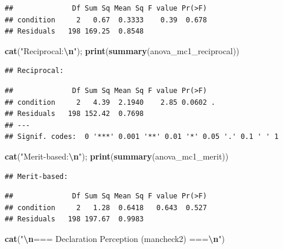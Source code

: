 \documentclass[
]{article}
\newenvironment{Shaded}{\begin{snugshade}}{\end{snugshade}}
\newcommand{\FunctionTok}[1]{\textcolor[rgb]{0.13,0.29,0.53}{\textbf{#1}}}
\newcommand{\NormalTok}[1]{#1}
\newcommand{\SpecialCharTok}[1]{\textcolor[rgb]{0.81,0.36,0.00}{\textbf{#1}}}
\newcommand{\StringTok}[1]{\textcolor[rgb]{0.31,0.60,0.02}{#1}}
\begin{document}
\begin{verbatim}
##              Df Sum Sq Mean Sq F value Pr(>F)
## condition     2   0.67  0.3333    0.39  0.678
## Residuals   198 169.25  0.8548
\end{verbatim}

\begin{Shaded}
\begin{Highlighting}[]
\FunctionTok{cat}\NormalTok{(}\StringTok{"Reciprocal:}\SpecialCharTok{\textbackslash{}n}\StringTok{"}\NormalTok{);    }\FunctionTok{print}\NormalTok{(}\FunctionTok{summary}\NormalTok{(anova\_mc1\_reciprocal))}
\end{Highlighting}
\end{Shaded}

\begin{verbatim}
## Reciprocal:
\end{verbatim}

\begin{verbatim}
##              Df Sum Sq Mean Sq F value Pr(>F)  
## condition     2   4.39  2.1940    2.85 0.0602 .
## Residuals   198 152.42  0.7698                 
## ---
## Signif. codes:  0 '***' 0.001 '**' 0.01 '*' 0.05 '.' 0.1 ' ' 1
\end{verbatim}

\begin{Shaded}
\begin{Highlighting}[]
\FunctionTok{cat}\NormalTok{(}\StringTok{"Merit{-}based:}\SpecialCharTok{\textbackslash{}n}\StringTok{"}\NormalTok{);   }\FunctionTok{print}\NormalTok{(}\FunctionTok{summary}\NormalTok{(anova\_mc1\_merit))}
\end{Highlighting}
\end{Shaded}

\begin{verbatim}
## Merit-based:
\end{verbatim}

\begin{verbatim}
##              Df Sum Sq Mean Sq F value Pr(>F)
## condition     2   1.28  0.6418   0.643  0.527
## Residuals   198 197.67  0.9983
\end{verbatim}

\begin{Shaded}
\begin{Highlighting}[]
\FunctionTok{cat}\NormalTok{(}\StringTok{"}\SpecialCharTok{\textbackslash{}n}\StringTok{=== Declaration Perception (mancheck2) ===}\SpecialCharTok{\textbackslash{}n}\StringTok{"}\NormalTok{)}
\end{Highlighting}
\end{Shaded}
\end{document}

